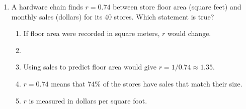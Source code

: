 \documentclass[12pt]{article}
\begin{document}
\begin{enumerate}[leftmargin=1.9em, itemsep=0.13in]
        Which is the best description of the association?\hfill{}\rule[-0.2in]{0pt}{0.48in}
        \begin{enumerate}[label=\textbf{(\Alph*)}, leftmargin=2.2em, itemsep=2pt]
          \item Strong, positive, and linear, with no unusual points.
          \item Strong, negative, and linear, with no unusual points.
          \item {}
          \item Weak and curved, because one site does not follow the others.
          \item There is no association, because one site has low temperature and low
                oxygen.
        \end{enumerate}

  \boxguard[9]%
  \item A hardware chain finds $r = 0.74$ between store floor area (square feet) and monthly
        sales (dollars) for its 40 stores. Which statement is true?
        \begin{enumerate}[label=\textbf{(\Alph*)}, leftmargin=2.2em, itemsep=2pt]
          \item If floor area were recorded in square meters, $r$ would change.
          \item {}
          \item Using sales to predict floor area would give $r = 1/0.74 \approx 1.35$.
          \item $r = 0.74$ means that 74\% of the stores have sales that match their size.
          \item $r$ is measured in dollars per square foot.\hfill{}\rule[-0.2in]{0pt}{0.48in}
        \end{enumerate}


\end{enumerate}
\end{document}
